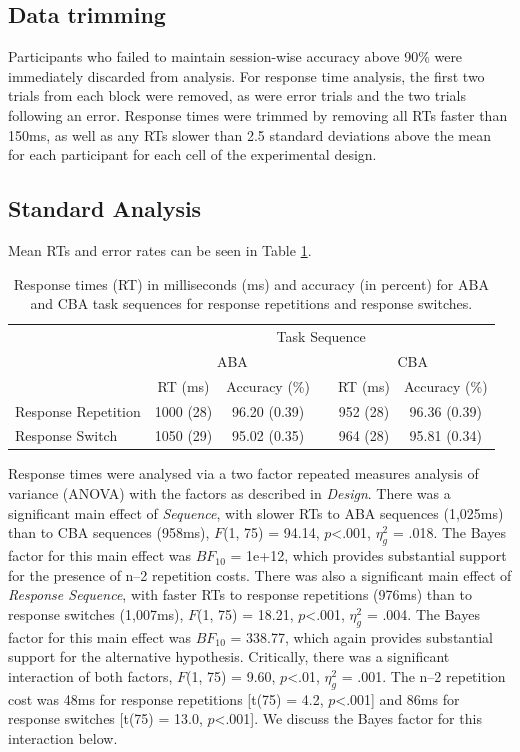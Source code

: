 \documentclass[a4paper, doc, natbib]{apa6}
\begin{document}
\subsection{Data trimming}
Participants who failed to maintain session-wise accuracy above 90\% were immediately discarded from analysis. For response time analysis, the first two trials from each block were removed, as were error trials and the two trials following an error. Response times were trimmed by removing all RTs faster than 150ms, as well as any RTs slower than 2.5 standard deviations above the mean for each participant for each cell of the experimental design. 

\subsection{Standard Analysis}
Mean RTs and error rates can be seen in Table \ref{tab:behaviouralData}.


\begin{table}[htbp]
\centering
\caption{Response times (RT) in milliseconds (ms) and accuracy (in percent) for ABA and CBA task sequences for response repetitions and response switches.}
\label{my-label}
\begin{tabular}{lccccc}
\hline
                    & \multicolumn{5}{c}{Task Sequence}                       \\ \cline{2-6} 
                    & \multicolumn{2}{c}{ABA}   &  & \multicolumn{2}{c}{CBA}  \\ \cline{2-3} \cline{5-6} 
                    & RT (ms)   & Accuracy (\%) &  & RT (ms)  & Accuracy (\%) \\ \hline
Response Repetition & 1000 (28) & 96.20 (0.39)  &  & 952 (28) & 96.36 (0.39) \\
Response Switch     & 1050 (29) & 95.02 (0.35)  &  & 964 (28) & 95.81 (0.34) \\ \hline
\end{tabular}
\label{tab:behaviouralData}
\end{table}

Response times were analysed via a two factor repeated measures analysis of variance (ANOVA) with the factors as described in \emph{Design}. There was a significant main effect of \emph{Sequence}, with slower RTs to ABA sequences (1,025ms) than to CBA sequences (958ms), $F$(1, 75) = 94.14, $p$<.001, $\eta_g^2$ = .018. The Bayes factor for this main effect was $BF_{10}$ = 1e+12, which provides substantial support for the presence of n--2 repetition costs. There was also a significant main effect of \emph{Response Sequence}, with faster RTs to response repetitions (976ms) than to response switches (1,007ms), $F$(1, 75) = 18.21, $p$<.001, $\eta_g^2$ = .004. The Bayes factor for this main effect was $BF_{10}$ = 338.77, which again provides substantial support for the alternative hypothesis. Critically, there was a significant interaction of both factors, $F$(1, 75) = 9.60, $p$<.01, $\eta_g^2$ = .001. The n--2 repetition cost was 48ms for response repetitions [t(75) = 4.2, $p$<.001] and 86ms for response switches [t(75) = 13.0, $p$<.001]. We discuss the Bayes factor for this interaction below.
\end{document}
